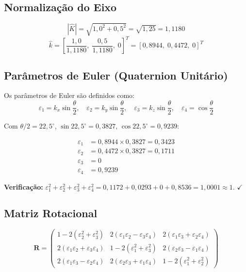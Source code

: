 \documentclass[12pt,a4paper]{article}
\newcommand{\degr}{^{\circ}}
\begin{document}
\subsection{Normalização do Eixo}

\[
  |\hat{K}| = \sqrt{1{,}0^2 + 0{,}5^2} = \sqrt{1{,}25} = 1{,}1180
\]
\[
  \hat{k} = \left[\frac{1{,}0}{1{,}1180},\;\frac{0{,}5}{1{,}1180},\;0\right]^T
           = [0{,}8944,\;0{,}4472,\;0]^T
\]

\subsection{Parâmetros de Euler (Quaternion Unitário)}

Os parâmetros de Euler são definidos como:
\[
  \varepsilon_1 = k_x\sin\frac{\theta}{2},\quad
  \varepsilon_2 = k_y\sin\frac{\theta}{2},\quad
  \varepsilon_3 = k_z\sin\frac{\theta}{2},\quad
  \varepsilon_4 = \cos\frac{\theta}{2}
\]

Com $\theta/2 = 22{,}5\degr$, $\sin 22{,}5\degr = 0{,}3827$, $\cos 22{,}5\degr = 0{,}9239$:

\begin{align*}
  \varepsilon_1 &= 0{,}8944 \times 0{,}3827 = 0{,}3423 \\
  \varepsilon_2 &= 0{,}4472 \times 0{,}3827 = 0{,}1711 \\
  \varepsilon_3 &= 0 \\
  \varepsilon_4 &= 0{,}9239
\end{align*}

\textbf{Verificação:} $\varepsilon_1^2+\varepsilon_2^2+\varepsilon_3^2+\varepsilon_4^2 = 0{,}1172+0{,}0293+0+0{,}8536 = 1{,}0001 \approx 1$. $\checkmark$

\subsection{Matriz Rotacional}

\[
\mathbf{R} =
\begin{pmatrix}
  1-2(\varepsilon_2^2+\varepsilon_3^2)       & 2(\varepsilon_1\varepsilon_2-\varepsilon_3\varepsilon_4) & 2(\varepsilon_1\varepsilon_3+\varepsilon_2\varepsilon_4) \\
  2(\varepsilon_1\varepsilon_2+\varepsilon_3\varepsilon_4) & 1-2(\varepsilon_1^2+\varepsilon_3^2)       & 2(\varepsilon_2\varepsilon_3-\varepsilon_1\varepsilon_4) \\
  2(\varepsilon_1\varepsilon_3-\varepsilon_2\varepsilon_4) & 2(\varepsilon_2\varepsilon_3+\varepsilon_1\varepsilon_4) & 1-2(\varepsilon_1^2+\varepsilon_2^2)
\end{pmatrix}
\]
\end{document}
